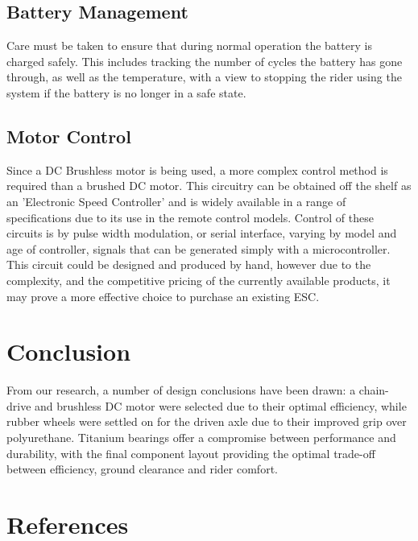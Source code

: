 \documentclass[journal,10pt]{IEEEtran}
\begin{document}
    \subsection{Battery Management}
    	Care must be taken to ensure that during normal operation the battery is charged safely.
    	This includes tracking the number of cycles the battery has gone through, as well as the temperature, with a view to stopping the rider using the system if the battery is no longer in a safe state.
    	
    \subsection{Motor Control}
    		Since a DC Brushless motor is being used, a more complex control method is required than a brushed DC motor.
    		This circuitry can be obtained off the shelf as an 'Electronic Speed Controller' and is widely available in a range of specifications due to its use in the remote control models.
    		Control of these circuits is by pulse width modulation, or serial interface, varying by model and age of controller, signals that can be generated simply with a microcontroller.
    		This circuit could be designed and produced by hand, however due to the complexity, and the competitive pricing of the currently available products, it may prove a more effective choice to purchase an existing ESC.
\section{Conclusion}
From our research, a number of design conclusions have been drawn: a chain-drive and brushless DC motor were selected due to their optimal efficiency, while rubber wheels were settled on for the driven axle due to their improved grip over polyurethane. Titanium bearings offer a compromise between performance and durability, with the final component layout providing the optimal trade-off between efficiency, ground clearance and rider comfort.
\section{References}

\cite{IEEEexample}
\cite{IEEEexample:standardproposed}




\end{document}
